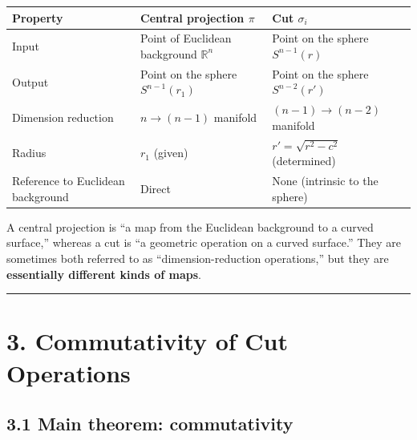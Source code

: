 \documentclass[a4paper,11pt]{article}
\theoremstyle{definition}
\theoremstyle{remark}
\begin{document}
{\def\LTcaptype{none} %
\begin{longtable}[]{@{}
  >{\raggedright\arraybackslash}p{}
  >{\raggedright\arraybackslash}p{}
  >{\raggedright\arraybackslash}p{}@{}}
\toprule\noalign{}
\begin{minipage}[b]{\linewidth}\raggedright
Property
\end{minipage} & \begin{minipage}[b]{\linewidth}\raggedright
Central projection \(\pi\)
\end{minipage} & \begin{minipage}[b]{\linewidth}\raggedright
Cut \(\sigma_i\)
\end{minipage} \\
\midrule\noalign{}
\endhead
\bottomrule\noalign{}
\endlastfoot
Input & Point of Euclidean background \(\mathbb{R}^n\) & Point on the
sphere \(S^{n-1}(r)\) \\
Output & Point on the sphere \(S^{n-1}(r_1)\) & Point on the sphere
\(S^{n-2}(r')\) \\
Dimension reduction & \(n \to (n-1)\) manifold & \((n-1) \to (n-2)\)
manifold \\
Radius & \(r_1\) (given) & \(r' = \sqrt{r^2 - c^2}\) (determined) \\
Reference to Euclidean background & Direct & None (intrinsic to the
sphere) \\
\end{longtable}
}

A central projection is ``a map from the Euclidean background to a
curved surface,'' whereas a cut is ``a geometric operation on a curved
surface.'' They are sometimes both referred to as ``dimension-reduction
operations,'' but they are \textbf{essentially different kinds of maps}.

\begin{center}\rule{0.5\linewidth}{0.5pt}\end{center}

\section{3. Commutativity of Cut
Operations}\label{commutativity-of-cut-operations}

\subsection{3.1 Main theorem:
commutativity}\label{main-theorem-commutativity}
\end{document}
